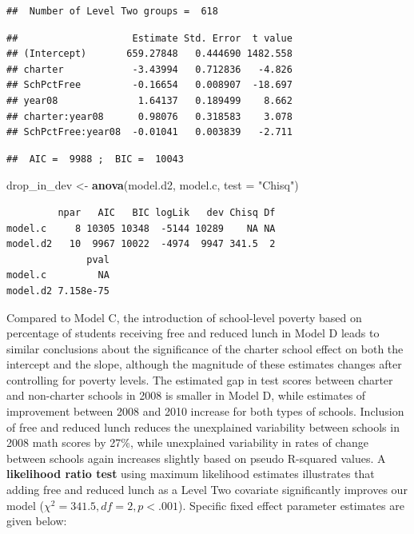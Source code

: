 \documentclass[
]{krantz}
\newenvironment{Shaded}{\begin{snugshade}}{\end{snugshade}}
\newcommand{\AttributeTok}[1]{\textcolor[rgb]{0.27,0.27,0.27}{#1}}
\newcommand{\FunctionTok}[1]{\textcolor[rgb]{0.27,0.27,0.27}{\textbf{#1}}}
\newcommand{\NormalTok}[1]{#1}
\newcommand{\OtherTok}[1]{\textcolor[rgb]{0.37,0.37,0.37}{#1}}
\newcommand{\StringTok}[1]{\textcolor[rgb]{0.5,0.5,0.5}{#1}}
\begin{document}
\begin{verbatim}
##  Number of Level Two groups =  618
\end{verbatim}

\begin{verbatim}
##                    Estimate Std. Error  t value
## (Intercept)       659.27848   0.444690 1482.558
## charter            -3.43994   0.712836   -4.826
## SchPctFree         -0.16654   0.008907  -18.697
## year08              1.64137   0.189499    8.662
## charter:year08      0.98076   0.318583    3.078
## SchPctFree:year08  -0.01041   0.003839   -2.711
\end{verbatim}

\begin{verbatim}
##  AIC =  9988 ;  BIC =  10043
\end{verbatim}

\begin{Shaded}
\begin{Highlighting}[]
\NormalTok{drop\_in\_dev }\OtherTok{\textless{}{-}} \FunctionTok{anova}\NormalTok{(model.d2, model.c, }\AttributeTok{test =} \StringTok{"Chisq"}\NormalTok{)}
\end{Highlighting}
\end{Shaded}

\begin{verbatim}
         npar   AIC   BIC logLik   dev Chisq Df
model.c     8 10305 10348  -5144 10289    NA NA
model.d2   10  9967 10022  -4974  9947 341.5  2
              pval
model.c         NA
model.d2 7.158e-75
\end{verbatim}

Compared to Model C, the introduction of school-level poverty based on percentage of students receiving free and reduced lunch in Model D leads to similar conclusions about the significance of the charter school effect on both the intercept and the slope, although the magnitude of these estimates changes after controlling for poverty levels. The estimated gap in test scores between charter and non-charter schools in 2008 is smaller in Model D, while estimates of improvement between 2008 and 2010 increase for both types of schools. Inclusion of free and reduced lunch reduces the unexplained variability between schools in 2008 math scores by 27\%, while unexplained variability in rates of change between schools again increases slightly based on pseudo R-squared values. A \textbf{likelihood ratio test} using maximum likelihood estimates illustrates that adding free and reduced lunch as a Level Two covariate significantly improves our model (\(\chi^2 = 341.5, df=2, p<.001\)). Specific fixed effect parameter estimates are given below:
\end{document}
